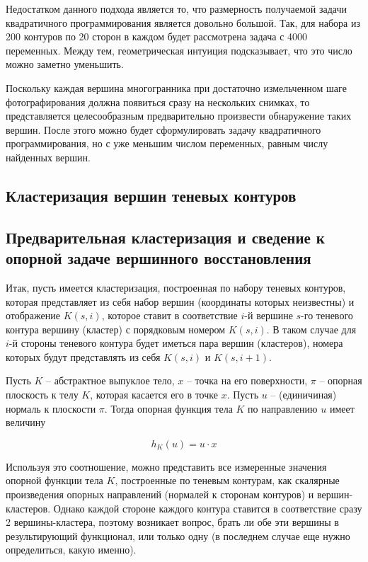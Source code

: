 \documentclass[a4paper, 12pt, titlepage]{article}
\theoremstyle{definition}
\theoremstyle{plain}
\theoremstyle{plain}
\begin{document}

Недостатком данного подхода является то, что размерность получаемой задачи
квадратичного программирования является довольно большой. Так, для набора из
200 контуров по 20 сторон в каждом будет рассмотрена задача с 4000
переменных. Между тем, геометрическая интуиция подсказывает, что это число
можно заметно уменьшить.

Поскольку каждая вершина многогранника при достаточно измельченном шаге
фотографирования должна появиться сразу на нескольких снимках, то
представляется целесообразным предварительно произвести обнаружение таких
вершин. После этого можно будет сформулировать задачу квадратичного
программирования, но с уже меньшим числом переменных, равным числу найденных
вершин.

\subsection{Кластеризация вершин теневых контуров}


\subsection{Предварительная кластеризация и сведение к опорной задаче
вершинного восстановления}

Итак, пусть имеется кластеризация, построенная по набору теневых контуров,
которая представляет из себя набор вершин (координаты которых неизвестны) и
отображение $K(s, i)$, которое ставит в соответствие $i$-й вершине $s$-го
теневого контура вершину (кластер) с порядковым номером $K(s, i)$. В таком
случае для $i$-й стороны теневого контура будет иметься пара вершин
(кластеров), номера которых будут представлять из себя $K(s, i)$ и $K(s, i +
1)$.

Пусть $K$ -- абстрактное выпуклое тело, $x$ -- точка на его поверхности, $\pi$
-- опорная плоскость к телу $K$, которая касается его в точке $x$. Пусть $u$ --
(единичиная) нормаль к плоскости $\pi$. Тогда опорная функция тела $K$ по
направлению $u$ имеет величину

$$h_{K}(u) = u \cdot x$$

Используя это соотношение, можно представить все измеренные значения опорной
функции тела $K$, построенные по теневым контурам, как скалярные произведения
опорных направлений (нормалей к сторонам контуров) и вершин-кластеров. Однако
каждой стороне каждого контура ставится в соответствие сразу 2
вершины-кластера, поэтому возникает вопрос, брать ли обе эти вершины в
результирующий функционал, или только одну (в последнем случае еще нужно
определиться, какую именно).
\end{document}
